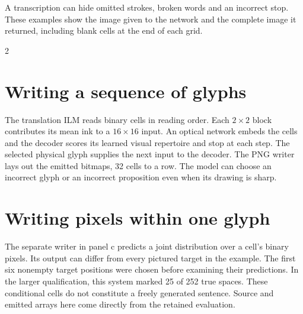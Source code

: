 \newpage
{}\label{page:raw-ilm}
\noindent A transcription can hide omitted strokes, broken words and an incorrect stop. These examples show the image given to the network and the complete image it returned, including blank cells at the end of each grid.
\begin{multicols}{2}
\section*{Writing a sequence of glyphs}
The translation ILM reads binary cells in reading order. Each $2\times2$ block contributes its mean ink to a $16\times16$ input. An optical network embeds the cells and the decoder scores its learned visual repertoire and stop at each step. The selected physical glyph supplies the next input to the decoder. The PNG writer lays out the emitted bitmaps, 32 cells to a row. The model can choose an incorrect glyph or an incorrect proposition even when its drawing is sharp.
\section*{Writing pixels within one glyph}
The separate writer in panel c predicts a joint distribution over a cell's binary pixels. Its output can differ from every pictured target in the example. The first six nonempty target positions were chosen before examining their predictions. In the larger qualification, this system marked 25 of 252 true spaces. These conditional cells do not constitute a freely generated sentence. Source and emitted arrays here come directly from the retained evaluation.
\end{multicols}
